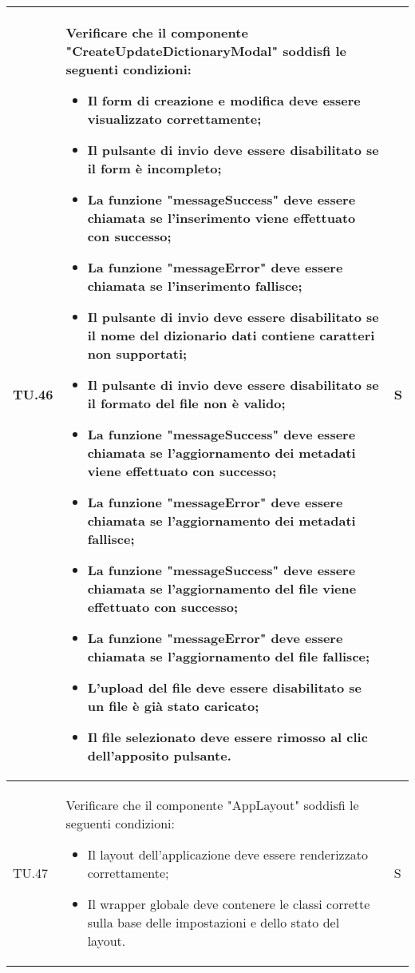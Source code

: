 \begin{adjustwidth}{-0.5cm}{-0.5cm}
\begin{longtable}{|P{1.5cm}|>{\raggedright}P{9.5cm}|>{\arraybackslash}P{1.5cm}|}
		\hline TU.46 & Verificare che il componente "CreateUpdateDictionaryModal" soddisfi le seguenti condizioni:
    \begin{itemize}
      \item Il form di creazione e modifica deve essere visualizzato correttamente;
			\item Il pulsante di invio deve essere disabilitato se il form è incompleto;
			\item La funzione "messageSuccess" deve essere chiamata se l'inserimento viene effettuato con successo;
			\item La funzione "messageError" deve essere chiamata se l'inserimento fallisce;
			\item Il pulsante di invio deve essere disabilitato se il nome del dizionario dati contiene caratteri non supportati;
			\item Il pulsante di invio deve essere disabilitato se il formato del file non è valido;
			\item La funzione "messageSuccess" deve essere chiamata se l'aggiornamento dei metadati viene effettuato con successo;
			\item La funzione "messageError" deve essere chiamata se l'aggiornamento dei metadati fallisce;
			\item La funzione "messageSuccess" deve essere chiamata se l'aggiornamento del file viene effettuato con successo;
			\item La funzione "messageError" deve essere chiamata se l'aggiornamento del file fallisce;
			\item L'upload del file deve essere disabilitato se un file è già stato caricato;
			\item Il file selezionato deve essere rimosso al clic dell'apposito pulsante.
    \end{itemize} & S \\

		\hline TU.47 & Verificare che il componente "AppLayout" soddisfi le seguenti condizioni:
    \begin{itemize}
      \item Il layout dell'applicazione deve essere renderizzato correttamente;
      \item Il wrapper globale deve contenere le classi corrette sulla base delle impostazioni e dello stato del layout.
    \end{itemize} & S \\


\end{longtable}
\end{adjustwidth}
